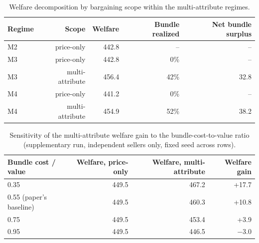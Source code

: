 \documentclass[review]{elsarticle}
\begin{document}
\begin{table}[htbp]
\centering
\caption{Average outcomes by institutional regime, pooled across all information, bargaining-scope, and concentration conditions.}
\label{tab:regime_summary}
\end{table}

\begin{table}[htbp]
\centering
\caption{Welfare decomposition by bargaining scope within the multi-attribute regimes.}
\label{tab:multiattr}
\begin{tabular}{lrrrr}
\toprule
Regime & Scope & Welfare & Bundle realized & Net bundle surplus \\
\midrule
M2 & price-only & 442.8 & -- & -- \\
M3 & price-only & 442.8 & 0\% & -- \\
M3 & multi-attribute & 456.4 & 42\% & 32.8 \\
M4 & price-only & 441.2 & 0\% & -- \\
M4 & multi-attribute & 454.9 & 52\% & 38.2 \\
\bottomrule
\end{tabular}
\end{table}

\begin{table}[htbp]
\centering
\caption{Sensitivity of the multi-attribute welfare gain to the bundle-cost-to-value ratio (supplementary run, independent sellers only, fixed seed across rows).}
\label{tab:bundlefrac}
\begin{tabular}{lrrr}
\toprule
Bundle cost / value & Welfare, price-only & Welfare, multi-attribute & Welfare gain \\
\midrule
0.35 & 449.5 & 467.2 & +17.7 \\
0.55 (paper's baseline) & 449.5 & 460.3 & +10.8 \\
0.75 & 449.5 & 453.4 & +3.9 \\
0.95 & 449.5 & 446.5 & $-3.0$ \\
\bottomrule
\end{tabular}
\end{table}
\end{document}
